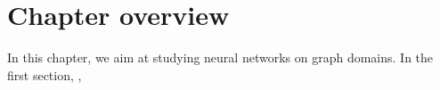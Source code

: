 \section*{Chapter overview}

\todo{}

In this chapter, we aim at studying neural networks on graph domains. In the first section, ,